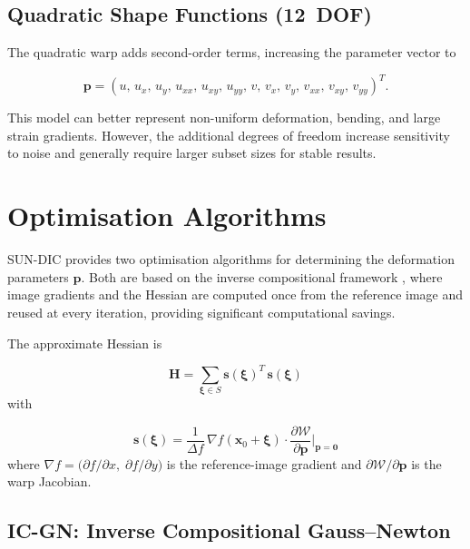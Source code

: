 \subsection{Quadratic Shape Functions (12~DOF)}

The quadratic warp adds second-order terms, increasing the parameter vector to

\[
\mathbf{p} = (u,\,u_x,\,u_y,\,u_{xx},\,u_{xy},\,u_{yy},\,
v,\,v_x,\,v_y,\,v_{xx},\,v_{xy},\,v_{yy})^T.
\]

This model can better represent non-uniform deformation, bending, and large strain gradients. However, the additional degrees of freedom increase sensitivity to noise and generally require larger subset sizes for stable results.


\section{Optimisation Algorithms}

SUN-DIC provides two optimisation algorithms for determining the deformation parameters $\mathbf{p}$.
Both are based on the inverse compositional framework \citep{Baker2001, Pan2013a}, where image gradients and the Hessian are computed once from the reference image and reused at every iteration, providing significant computational savings.

The approximate Hessian is

\begin{equation}
	\label{eqn:hessian}
	\mathbf{H} = \sum_{\boldsymbol{\xi} \in S}
	\mathbf{s}(\boldsymbol{\xi})^T\,\mathbf{s}(\boldsymbol{\xi})
\end{equation}
with

\begin{equation}
	\mathbf{s}(\boldsymbol{\xi})
	= \frac{1}{\Delta f}\,
	\nabla f(\mathbf{x}_0+\boldsymbol{\xi})\cdot
	\frac{\partial \mathcal{W}}{\partial \mathbf{p}}\bigg|_{\mathbf{p}=\mathbf{0}}
\end{equation}
where $\nabla f = \bigl(\partial f/\partial x,\;\partial f/\partial y\bigr)$ is the reference-image gradient and $\partial\mathcal{W}/\partial\mathbf{p}$ is the warp Jacobian.

\subsection{IC-GN: Inverse Compositional Gauss--Newton}
\label{sec:icgn}

